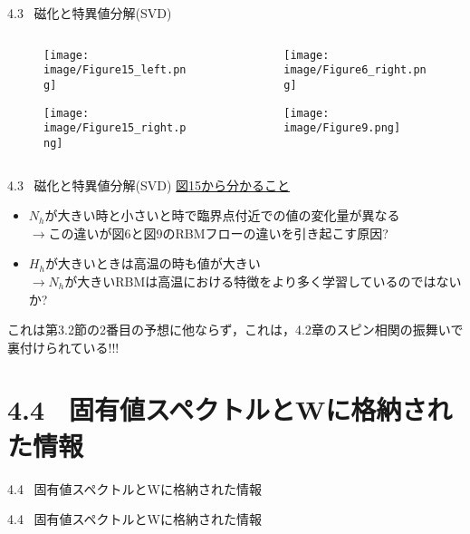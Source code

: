 \documentclass[dvipdfmx,8pt]{beamer}
\begin{document}
\begin{frame}[t]{4.3 \ 磁化と特異値分解(SVD)}
  \begin{columns}
    \begin{column}{0.5\textwidth}
      \begin{figure}
        \begin{center}
          \texttt{[image: image/Figure15\_left.png]}
        \end{center}
      \end{figure}
      \begin{figure}
        \begin{center}
          \texttt{[image: image/Figure15\_right.png]}
        \end{center}
      \end{figure}
    \end{column}
    \begin{column}{0.5\textwidth}
      \begin{figure}
        \begin{center}
          \texttt{[image: image/Figure6\_right.png]}
        \end{center}
      \end{figure}
      \begin{figure}
        \begin{center}
          \texttt{[image: image/Figure9.png]}
        \end{center}
      \end{figure}
    \end{column}
  \end{columns}
\end{frame}

\begin{frame}[t]{4.3 \ 磁化と特異値分解(SVD)}
  \underline{図15から分かること}
  \vspace{0.2cm}
  \begin{itemize}
    \item $N_h$が大きい時と小さいと時で臨界点付近での値の変化量が異なる\\
    \vspace{0.2cm}
    $\rightarrow$この違いが図6と図9のRBMフローの違いを引き起こす原因?
    \item $H_h$が大きいときは高温の時も値が大きい\\
    \vspace{0.2cm}
    $\rightarrow$$N_h$が大きいRBMは高温における特徴をより多く学習しているのではないか?
  \end{itemize}
  \vspace{0.2cm}
  これは第3.2節の2番目の予想に他ならず，これは，4.2章のスピン相関の振舞いで裏付けられている!!!
\end{frame}

\section{4.4 \ 固有値スペクトルとWに格納された情報}
\begin{frame}[t]{4.4 \ 固有値スペクトルとWに格納された情報}
 
\end{frame}

\begin{frame}[t]{4.4 \ 固有値スペクトルとWに格納された情報}
 
\end{frame}
\end{document}
